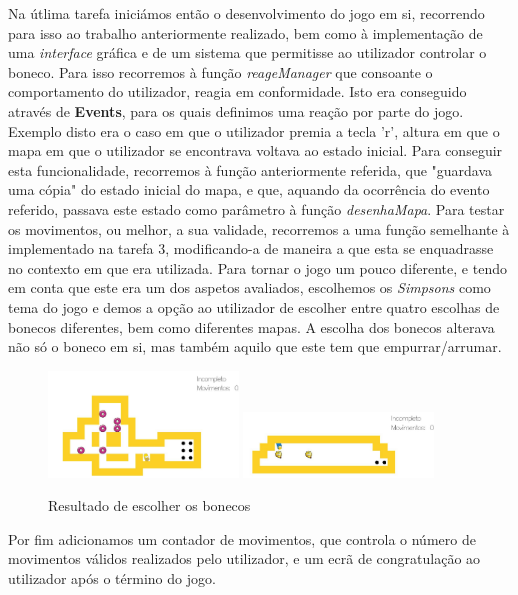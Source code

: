\documentclass[a4paper]{article}
\begin{document}
Na útlima tarefa iniciámos então o desenvolvimento do jogo em si, recorrendo para isso ao trabalho anteriormente realizado, bem como à implementação de uma \textit{interface} gráfica e de um sistema que permitisse ao utilizador controlar o boneco. Para isso recorremos à função \emph{reageManager} que consoante o comportamento do utilizador, reagia em conformidade. Isto era conseguido através de \textbf{Events}, para os quais definimos uma reação por parte do jogo. Exemplo disto era o caso em que o utilizador premia a tecla 'r', altura em que o mapa em que o utilizador se encontrava voltava ao estado inicial. Para conseguir esta funcionalidade, recorremos à função anteriormente referida, que "guardava uma cópia" do estado inicial do mapa, e que, aquando da ocorrência do evento referido, passava este estado como parâmetro à função \emph{desenhaMapa}. Para testar os movimentos, ou melhor, a sua validade, recorremos a uma função semelhante à implementado na tarefa 3, modificando-a de maneira a que esta se enquadrasse no contexto em que era utilizada. 
Para tornar o jogo um pouco diferente, e tendo em conta que este era um dos aspetos avaliados, escolhemos os \emph{Simpsons} como tema do jogo e demos a opção ao utilizador de escolher entre quatro escolhas de bonecos diferentes, bem como diferentes mapas. A escolha dos bonecos alterava não só o boneco em si, mas também aquilo que este tem que empurrar/arrumar. 

\begin{figure}[ht]
	\centering
	\includegraphics[width=0.45\textwidth]{assets/escolha1.jpg}
	\includegraphics[width=0.45\textwidth]{assets/escolha2.jpg}  
	\caption{Resultado de escolher os bonecos}
\end{figure}

Por fim adicionamos um contador de movimentos, que controla o número de movimentos válidos realizados pelo utilizador, e um ecrã de congratulação ao utilizador após o término do jogo.
\end{document}
